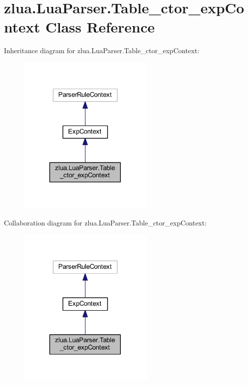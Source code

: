 \hypertarget{classzlua_1_1_lua_parser_1_1_table__ctor__exp_context}{}\section{zlua.\+Lua\+Parser.\+Table\+\_\+ctor\+\_\+exp\+Context Class Reference}
\label{classzlua_1_1_lua_parser_1_1_table__ctor__exp_context}


Inheritance diagram for zlua.\+Lua\+Parser.\+Table\+\_\+ctor\+\_\+exp\+Context\+:
\nopagebreak
\begin{figure}[H]
\begin{center}
\leavevmode
\includegraphics[width=188pt]{classzlua_1_1_lua_parser_1_1_table__ctor__exp_context__inherit__graph}
\end{center}
\end{figure}


Collaboration diagram for zlua.\+Lua\+Parser.\+Table\+\_\+ctor\+\_\+exp\+Context\+:
\nopagebreak
\begin{figure}[H]
\begin{center}
\leavevmode
\includegraphics[width=188pt]{classzlua_1_1_lua_parser_1_1_table__ctor__exp_context__coll__graph}
\end{center}
\end{figure}
